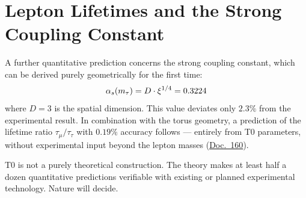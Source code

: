 \section{Lepton Lifetimes and the Strong Coupling Constant}

A further quantitative prediction concerns the strong coupling constant, which can be derived purely geometrically for the first time:
\begin{equation}
\alpha_s(m_\tau) = D \cdot \xi^{1/4} = 0.3224
\end{equation}
where $D = 3$ is the spatial dimension. This value deviates only $2.3\%$ from the experimental result. In combination with the torus geometry, a prediction of the lifetime ratio $\tau_\mu/\tau_\tau$ with $0.19\%$ accuracy follows --- entirely from T0 parameters, without experimental input beyond the lepton masses (\href{https://github.com/jpascher/T0-Time-Mass-Duality/blob/main/2/pdf/160_T0_Lepton-Lebensdauer-Verh_En.pdf}{Doc.~160}).

\begin{zusammenfassung}
T0 is not a purely theoretical construction. The theory makes at least half a dozen quantitative predictions verifiable with existing or planned experimental technology. Nature will decide.
\end{zusammenfassung}
